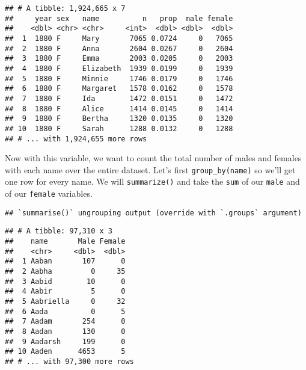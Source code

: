 \documentclass[
]{article}
\newenvironment{Shaded}{\begin{snugshade}}{\end{snugshade}}
\newcommand{\DataTypeTok}[1]{\textcolor[rgb]{0.13,0.29,0.53}{#1}}
\newcommand{\DecValTok}[1]{\textcolor[rgb]{0.00,0.00,0.81}{#1}}
\newcommand{\KeywordTok}[1]{\textcolor[rgb]{0.13,0.29,0.53}{\textbf{#1}}}
\newcommand{\NormalTok}[1]{#1}
\newcommand{\OperatorTok}[1]{\textcolor[rgb]{0.81,0.36,0.00}{\textbf{#1}}}
\newcommand{\StringTok}[1]{\textcolor[rgb]{0.31,0.60,0.02}{#1}}
\begin{document}
\begin{verbatim}
## # A tibble: 1,924,665 x 7
##     year sex   name          n   prop  male female
##    <dbl> <chr> <chr>     <int>  <dbl> <dbl>  <dbl>
##  1  1880 F     Mary       7065 0.0724     0   7065
##  2  1880 F     Anna       2604 0.0267     0   2604
##  3  1880 F     Emma       2003 0.0205     0   2003
##  4  1880 F     Elizabeth  1939 0.0199     0   1939
##  5  1880 F     Minnie     1746 0.0179     0   1746
##  6  1880 F     Margaret   1578 0.0162     0   1578
##  7  1880 F     Ida        1472 0.0151     0   1472
##  8  1880 F     Alice      1414 0.0145     0   1414
##  9  1880 F     Bertha     1320 0.0135     0   1320
## 10  1880 F     Sarah      1288 0.0132     0   1288
## # ... with 1,924,655 more rows
\end{verbatim}

Now with this variable, we want to count the total number of males and
females with each name over the entire dataset. Let's first
\texttt{group\_by(name)} so we'll get one row for every name. We will
\texttt{summarize()} and take the \texttt{sum} of our \texttt{male} and
of our \texttt{female} variables.

\begin{Shaded}
\end{Shaded}

\begin{verbatim}
## `summarise()` ungrouping output (override with `.groups` argument)
\end{verbatim}

\begin{verbatim}
## # A tibble: 97,310 x 3
##    name       Male Female
##    <chr>     <dbl>  <dbl>
##  1 Aaban       107      0
##  2 Aabha         0     35
##  3 Aabid        10      0
##  4 Aabir         5      0
##  5 Aabriella     0     32
##  6 Aada          0      5
##  7 Aadam       254      0
##  8 Aadan       130      0
##  9 Aadarsh     199      0
## 10 Aaden      4653      5
## # ... with 97,300 more rows
\end{verbatim}
\end{document}
